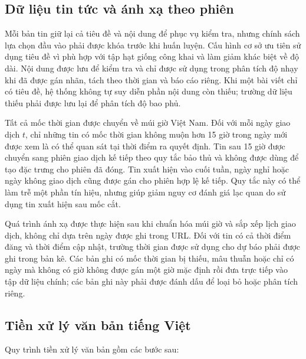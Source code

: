 \documentclass[12pt, a4paper, oneside]{report}
\begin{document}
\subsection{Dữ liệu tin tức và ánh xạ theo phiên}

Mỗi bản tin giữ lại cả tiêu đề và nội dung để phục vụ kiểm tra, nhưng chính sách lựa
chọn đầu vào phải được khóa trước khi huấn luyện. Cấu hình cơ sở ưu tiên sử dụng tiêu
đề vì phù hợp với tập hạt giống công khai và làm giảm khác biệt về độ dài. Nội dung
được lưu để kiểm tra và chỉ được sử dụng trong phân tích độ nhạy khi đã được gán nhãn,
tách theo thời gian và báo cáo riêng. Khi một bài viết chỉ có tiêu đề, hệ thống không
tự suy diễn phần nội dung còn thiếu; trường dữ liệu thiếu phải được lưu lại để phân
tích độ bao phủ.

Tất cả mốc thời gian được chuyển về múi giờ Việt Nam. Đối với mỗi ngày giao dịch $t$,
chỉ những tin có mốc thời gian không muộn hơn 15 giờ trong ngày mới được xem là có thể
quan sát tại thời điểm ra quyết định. Tin sau 15 giờ được chuyển sang phiên giao dịch
kế tiếp theo quy tắc bảo thủ và không được dùng để tạo đặc trưng cho phiên đã đóng.
Tin xuất hiện vào cuối tuần, ngày nghỉ hoặc ngày không giao dịch cũng được gán cho
phiên hợp lệ kế tiếp. Quy tắc này có thể làm trễ một phần tín hiệu, nhưng giúp giảm
nguy cơ đánh giá lạc quan do sử dụng tin xuất hiện sau mốc cắt.

Quá trình ánh xạ được thực hiện sau khi chuẩn hóa múi giờ và sắp xếp lịch giao dịch,
không chỉ dựa trên ngày được ghi trong URL. Đối với tin có cả thời điểm đăng và thời
điểm cập nhật, trường thời gian được sử dụng cho dự báo phải được ghi trong bản kê.
Các bản ghi có mốc thời gian bị thiếu, mâu thuẫn hoặc chỉ có ngày mà không có giờ
không được gán một giờ mặc định rồi đưa trực tiếp vào tập dữ liệu chính; các bản ghi
này phải được đánh dấu để loại bỏ hoặc phân tích riêng.

\subsection{Tiền xử lý văn bản tiếng Việt}

Quy trình tiền xử lý văn bản gồm các bước sau:
\end{document}
